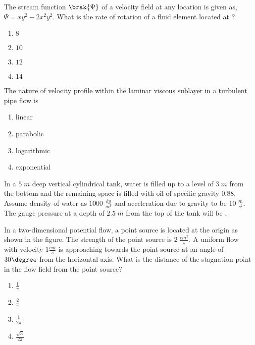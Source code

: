 \iffalse

\chapter{2017}
\section{xe}
\author{AI24BTECH11023 - Tarun Reddy Pakala}
\fi
\item The stream function $\brak{\Psi}$ of a velocity field at any location  is given as, $\Psi=xy^2-2x^2y^2$. What is the rate of rotation of a fluid element located at ?
\begin{enumerate}
    \item $8$
    \item $10$
    \item $12$
    \item $14$
\end{enumerate}
\item The nature of velocity profile within the laminar viscous sublayer in a turbulent pipe flow is
\begin{enumerate}
    \item linear 
    \item parabolic
    \item logarithmic
    \item exponential
\end{enumerate}
\item In a $5\;m$ deep vertical cylindrical tank, water is filled up to a level of $3\;m$ from the bottom and the remaining space is filled with oil of specific gravity $0.88$. Assume density of water as $1000\;\frac{kg}{m^3}$ and acceleration due to gravity to be $10\;\frac{m}{s^2}$. The gauge pressure  at a depth of $2.5\;m$ from the top of the tank will be \underline{\hspace{2cm}}.
\item In a two-dimensional potential flow, a point source is located at the origin  as shown in the figure. The strength of the point source is $2\;\frac{cm^2}{s}$. A uniform flow with velocity $1\frac{cm}{s}$ is approaching towards the point source at an angle of $30\degree$ from the horizontal axis. What is the distance  of the stagnation point in the flow field from the point source?

\begin{enumerate}
    \item $\frac{1}{\pi}$
    \item $\frac{2}{\pi}$
    \item $\frac{1}{2\pi}$
    \item $\frac{\sqrt{3}}{2\pi}$
\end{enumerate}
